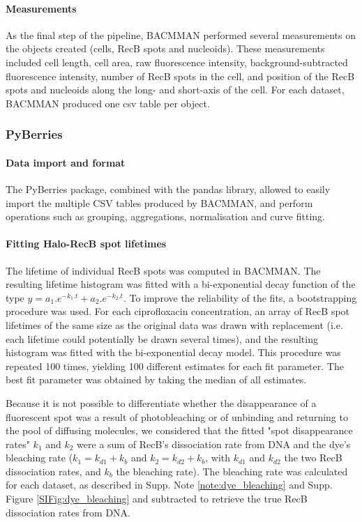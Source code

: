 \paragraph*{Measurements}
As the final step of the pipeline, BACMMAN performed several measurements on the objects created (cells, RecB spots and nucleoids). These measurements included cell length, cell area, raw fluorescence intensity, background-subtracted fluorescence intensity, number of RecB spots in the cell, and position of the RecB spots and nucleoids along the long- and short-axis of the cell. For each dataset, BACMMAN produced one csv table per object.

\subsubsection*{PyBerries}
\paragraph*{Data import and format}
The PyBerries package, combined with the pandas library, allowed to easily import the multiple CSV tables produced by BACMMAN, and perform operations such as grouping, aggregations, normalisation and curve fitting.

\paragraph*{Fitting Halo-RecB spot lifetimes}
The lifetime of individual Rec\-B spots was computed in BACMMAN. The resulting lifetime histogram was fitted with a bi-exponential decay function of the type $y=a_1.e^{-k_1.t} + a_2.e^{-k_2.t}$. To improve the reliability of the fits, a bootstrapping procedure was used. For each ciprofloxacin concentration, an array of RecB spot lifetimes of the same size as the original data was drawn with replacement (i.e. each lifetime could potentially be drawn several times), and the resulting histogram was fitted with the bi-exponential decay model. This procedure was repeated 100 times, yielding 100 different estimates for each fit parameter. The best fit parameter was obtained by taking the median of all estimates.

Because it is not possible to differentiate whether the disappearance of a fluorescent spot was a result of photobleaching or of unbinding and returning to the pool of diffusing molecules, we considered that the fitted "spot disappearance rates" $k_1$ and $k_2$ were a sum of RecB's dissociation rate from DNA and the dye's bleaching rate ($k_1=k_{d1}+k_b$ and $k_2=k_{d2}+k_b$, with $k_{d1}$ and $k_{d2}$ the two RecB dissociation rates, and $k_b$ the bleaching rate). The bleaching rate was calculated for each dataset, as described in Supp. Note \ref{note:dye_bleaching} and Supp. Figure \ref{SIFig:dye_bleaching} and subtracted to retrieve the true RecB dissociation rates from DNA.

